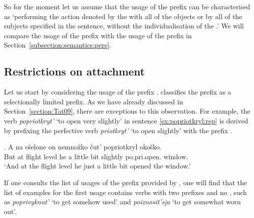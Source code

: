 So for the moment let us assume that the  usage of the prefix  can be characterised as `performing the action denoted by the  with all of the objects or by all of the subjects specified in the sentence, without the individualisation of the .' We will compare the  usage of the prefix  with the  usage of the prefix  in Section~\ref{subsection:semantics:pere}.

\subsection{Restrictions on attachment} 
Let us start by considering the  usage of the prefix . \citet{Tatevosov:09} classifies the  prefix  as a selectionally limited prefix. As we have already discussed in Section~\ref{section:Tat09}, there are exceptions to this observation. For example, the verb \textit{popriotkryt'} `to open very slightly' in sentence \ref{ex:popriotkryl:rep} is derived by prefixing the perfective verb \textit{priotkryt'} `to open slightly' with the  prefix .\largerpage

\exg. \label{ex:popriotkryl:rep}A na e\v{s}elone on nemno\v{z}ko \v{c}ut' popriotkryl oko\v{s}ko.\\
But at {flight level} he {a little bit} {slightly} po.pri.open. window.\\
\trans `And at the flight level he just a little bit opened the window.'\\

If one consults the list of usages of the prefix  provided by \citet{Shvedova:82}, one will find that the list of examples for the first usage contains verbs with two prefixes and no , such as \textit{poprivyknut'} `to get somehow used' and \textit{poiznosit'sja} `to get somewhat worn out'. 


